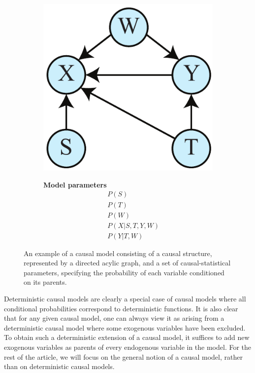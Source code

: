 \documentclass[letterpaper,onecolumn,nofootinbib]{revtex4}
\begin{document}
\begin{figure}[htbp]
	\begin{subfigure}[b]{0.2\textwidth}
		\centering
  		\includegraphics[width=\textwidth]{stab-graph}
	\end{subfigure}
	\quad
	\begin{subfigure}[b]{0.2\textwidth}
		\textbf{Model parameters}
		\begin{eqnarray*}
			&&P(S)\\
			&&P(T)\\
			&&P(W)\\
			&&P(X|S,T,Y,W)\\
			&&P(Y|T,W)
		\end{eqnarray*}
	\end{subfigure}
\caption{An example of a causal model consisting of a causal structure, represented by a directed acylic graph, and a set of causal-statistical parameters, specifying the probability of each variable conditioned on its parents.}
\label{fig:STAB-graph}
\end{figure}

Deterministic causal models are clearly a special case of causal models where all conditional probabilities correspond to deterministic functions. It is also clear that for any given causal model, one can always view it as arising from a deterministic causal model where some exogenous variables have been excluded.  To obtain such a deterministic extension of a causal model, it suffices to add new exogenous variables as parents of every endogenous variable in the model. For the rest of the article, we will focus on the general notion of a causal model, rather than on deterministic causal models.  
\end{document}
